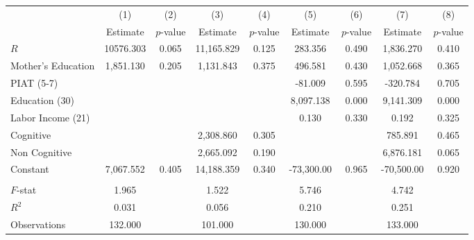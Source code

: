 \begin{tabular}{lcccccccc} \toprule
 & (1) & (2) & (3) & (4) & (5) & (6) & (7) & (8) \\ 
 & Estimate  & $p$-value  & Estimate  & $p$-value  & Estimate  & $p$-value  & Estimate  & $p$-value  \\  \midrule
$R$ & 10576.303 &     0.065 & 11,165.829 &     0.125 &   283.356 &     0.490 &  1,836.270 &     0.410 \\  
Mother's Education &  1,851.130 &     0.205 &  1,131.843 &     0.375 &   496.581 &     0.430 &  1,052.668 &     0.365 \\  
PIAT (5-7) &         &         &         &         &   -81.009 &     0.595 &  -320.784 &     0.705 \\  
Education (30) &         &         &         &         &  8,097.138 &     0.000 &  9,141.309 &     0.000 \\  
Labor Income (21) &         &         &         &         &     0.130 &     0.330 &     0.192 &     0.325 \\  
Cognitive &         &         &  2,308.860 &     0.305 &         &         &   785.891 &     0.465 \\  
Non Cognitive &         &         &  2,665.092 &     0.190 &         &         &  6,876.181 &     0.065 \\  
Constant &  7,067.552 &     0.405 & 14,188.359 &     0.340 & -73,300.00 &     0.965 & -70,500.00 &     0.920 \\ \\  \midrule
$F$-stat &     1.965 &         &     1.522 &         &     5.746 &         &     4.742 &         \\  
$R^2$ &     0.031 &         &     0.056 &         &     0.210 &         &     0.251 &         \\  
Observations &   132.000 &         &   101.000 &         &   130.000 &         &   133.000 &         \\  
\bottomrule  \end{tabular}
